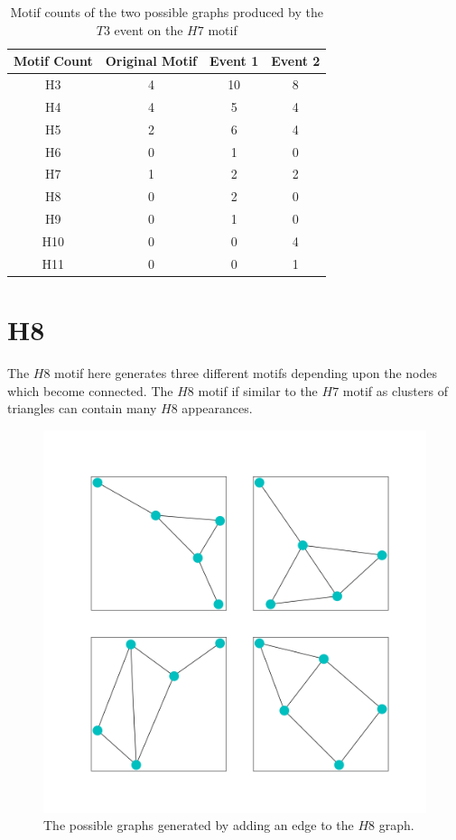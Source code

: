 \begin{table}
    \centering
    \begin{tabular}{||c c c c||} 
    \hline
    Motif Count & Original Motif & Event 1 & Event 2  \\ [0.5ex] 
    \hline\hline
    H3 & 4 & 10 & 8\\ 
    \hline
    H4 & 4 & 5& 4 \\
    \hline
    H5 & 2 & 6 & 4 \\
    \hline
    H6 & 0 & 1 & 0 \\
    \hline
    H7 & 1 & 2 & 2 \\
    \hline
    H8 & 0 & 2 & 0\\
    \hline
    H9 & 0 & 1 & 0 \\
    \hline
    H10 & 0 & 0 & 4 \\
    \hline
    H11 & 0 & 0 & 1\\
    \hline
   \end{tabular}
   \caption{Motif counts of the two possible graphs produced by the $T3$ event on the $H7$ motif}
   \label{table:16}
\end{table}

\section{H8}
The $H8$ motif here generates three different motifs depending upon the nodes which become connected.
The $H8$ motif if similar to the $H7$ motif as clusters of triangles can contain many $H8$ appearances. 

\begin{figure}[!ht]
    \includegraphics[width=12cm]{Images/H8_T3_evolution.png}
    \centering
    \caption{The possible graphs generated by adding an edge to the $H8$ graph.}
\end{figure}

